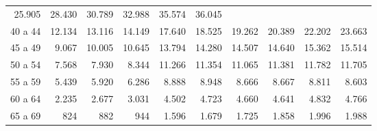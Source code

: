 \begin{tabular}{llllllllll}
  \multicolumn{1}{r}{25.905} &
  \multicolumn{1}{r}{28.430} &
  \multicolumn{1}{r}{30.789} &
  \multicolumn{1}{r}{32.988} &
  \multicolumn{1}{r}{35.574} &
  \multicolumn{1}{r}{36.045} \\
\multicolumn{1}{l}{\hspace{1em}40 a 44} &
  \multicolumn{1}{|r}{12.134} &
  \multicolumn{1}{r}{13.116} &
  \multicolumn{1}{r}{14.149} &
  \multicolumn{1}{r}{17.640} &
  \multicolumn{1}{r}{18.525} &
  \multicolumn{1}{r}{19.262} &
  \multicolumn{1}{r}{20.389} &
  \multicolumn{1}{r}{22.202} &
  \multicolumn{1}{r}{23.663} \\
\multicolumn{1}{l}{\hspace{1em}45 a 49} &
  \multicolumn{1}{|r}{9.067} &
  \multicolumn{1}{r}{10.005} &
  \multicolumn{1}{r}{10.645} &
  \multicolumn{1}{r}{13.794} &
  \multicolumn{1}{r}{14.280} &
  \multicolumn{1}{r}{14.507} &
  \multicolumn{1}{r}{14.640} &
  \multicolumn{1}{r}{15.362} &
  \multicolumn{1}{r}{15.514} \\
\multicolumn{1}{l}{\hspace{1em}50 a 54} &
  \multicolumn{1}{|r}{7.568} &
  \multicolumn{1}{r}{7.930} &
  \multicolumn{1}{r}{8.344} &
  \multicolumn{1}{r}{11.266} &
  \multicolumn{1}{r}{11.354} &
  \multicolumn{1}{r}{11.065} &
  \multicolumn{1}{r}{11.381} &
  \multicolumn{1}{r}{11.782} &
  \multicolumn{1}{r}{11.705} \\
\multicolumn{1}{l}{\hspace{1em}55 a 59} &
  \multicolumn{1}{|r}{5.439} &
  \multicolumn{1}{r}{5.920} &
  \multicolumn{1}{r}{6.286} &
  \multicolumn{1}{r}{8.888} &
  \multicolumn{1}{r}{8.948} &
  \multicolumn{1}{r}{8.666} &
  \multicolumn{1}{r}{8.667} &
  \multicolumn{1}{r}{8.811} &
  \multicolumn{1}{r}{8.603} \\
\multicolumn{1}{l}{\hspace{1em}60 a 64} &
  \multicolumn{1}{|r}{2.235} &
  \multicolumn{1}{r}{2.677} &
  \multicolumn{1}{r}{3.031} &
  \multicolumn{1}{r}{4.502} &
  \multicolumn{1}{r}{4.723} &
  \multicolumn{1}{r}{4.660} &
  \multicolumn{1}{r}{4.641} &
  \multicolumn{1}{r}{4.832} &
  \multicolumn{1}{r}{4.766} \\
\multicolumn{1}{l}{\hspace{1em}65 a 69} &
  \multicolumn{1}{|r}{824} &
  \multicolumn{1}{r}{882} &
  \multicolumn{1}{r}{944} &
  \multicolumn{1}{r}{1.596} &
  \multicolumn{1}{r}{1.679} &
  \multicolumn{1}{r}{1.725} &
  \multicolumn{1}{r}{1.858} &
  \multicolumn{1}{r}{1.996} &
  \multicolumn{1}{r}{1.988} \\

\end{tabular}
